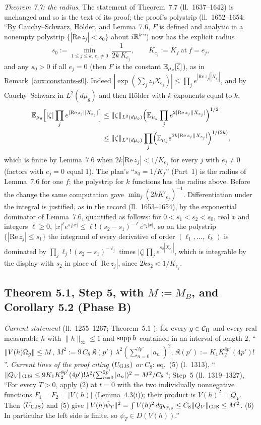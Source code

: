 \emph{Theorem 7.7: the radius.}  The statement of Theorem~7.7 (ll.~1637--1642) is unchanged and
so is the text of its proof; the proof's polystrip (ll.~1652--1654: ``By Cauchy--Schwarz,
H\"older, and Lemma~7.6, $F$ is defined and analytic in a nonempty polystrip
$\{|\mathrm{Re}\,z_j|<s_0\}$ about $i\mathbb{R}^k$'') now has the explicit radius
\[
 s_0:=\min_{1\le j\le k,\ e_j\ne0}\ \frac1{2k\,K_{e_j}},\qquad K_{e_j}:=K_f\ \text{at}\ f=e_j ,
\]
and any $s_0>0$ if all $e_j=0$ (then $F$ is the constant $\mathbb{E}_{\mu_g}[\overline\zeta]$), as in
Remark~\ref{aux:constants-s0}.  Indeed $|\exp(\sum_jz_jX_{e_j})|\le\prod_je^{|\mathrm{Re}\,z_j|
|X_{e_j}|}$, and by Cauchy--Schwarz in $L^2(d\mu_g)$ and then H\"older with $k$ exponents equal
to $k$,
\begin{align*}
 \mathbb{E}_{\mu_g}\Bigl[|\zeta|\prod_je^{|\mathrm{Re}\,z_j||X_{e_j}|}\Bigr]
 &\le\|\zeta\|_{L^2(d\mu_g)}\Bigl(\mathbb{E}_{\mu_g}\prod_je^{2|\mathrm{Re}\,z_j||X_{e_j}|}\Bigr)^{1/2}\\
 &\le\|\zeta\|_{L^2(d\mu_g)}\prod_j\Bigl(\mathbb{E}_{\mu_g}e^{2k|\mathrm{Re}\,z_j||X_{e_j}|}\Bigr)^{1/(2k)},
\end{align*}
which is finite by Lemma~7.6 when $2k|\mathrm{Re}\,z_j|<1/K_{e_j}$ for every $j$ with $e_j\ne0$
(factors with $e_j=0$ equal $1$).  The plan's ``$s_0=1/K_f$'' (Part~1) is the radius of Lemma~7.6
for one $f$; the polystrip for $k$ functions has the radius above.  Before the change the same
computation gave $\min_j(2kK'_{e_j})^{-1}$.  Differentiation under the integral is justified, as in
the record (ll.~1653--1654), by the exponential dominator of Lemma~7.6, quantified as follows: for
$0<s_1<s_2<s_0$, real $x$ and integers $\ell\ge0$, $|x|^\ell e^{s_1|x|}\le\ell!\,(s_2-s_1)^{-\ell}
e^{s_2|x|}$, so on the polystrip $\{|\mathrm{Re}\,z_j|\le s_1\}$ the integrand of every
derivative of order $(\ell_1,\dots,\ell_k)$ is dominated by $\prod_j\ell_j!\,(s_2-s_1)^{-\ell_j}$
times $|\zeta|\prod_je^{s_2|X_{e_j}|}$, which is integrable by the display with $s_2$ in place of
$|\mathrm{Re}\,z_j|$, since $2ks_2<1/K_{e_j}$.

\subsection{Theorem 5.1, Step 5, with $M:=M_B$, and Corollary 5.2 (Phase B)}\label{sub:cons-51}

\emph{Current statement} (ll.~1255--1267; Theorem~5.1 \cite[p.~18]{R}): for every $g\in\mathcal{C}_{\mathrm H}$ and
every real measurable $h$ with $\|h\|_\infty\le1$ and $\operatorname{supp} h$ contained in an interval of
length $2$, ``$\|V(h)\Omega_g\|\le M$, $M^2:=9\,C_8\,\mathfrak K(p')\,\lambda^2(\sum_{n=0}^{2p'}|a_n|)^2$,
$\mathfrak K(p'):=K_1K_2^{8p'}(4p')!$''.  \emph{Current lines of the proof citing $(U_{\rm GJS})$ or
$C_8$}: eq.~(5) (l.~1313), ``$\|Q_V\|_{\rm GJS}\le9K_1K_2^{8p'}(4p')!\lambda^2(\sum_{n=0}^{2p'}
|a_n|)^2=M^2/C_8$''; Step~5 (ll.~1319--1327), ``For every $T>0$, apply (2) at $t=0$ with the two
individually nonnegative functions $F_1=F_2=|V(h)|$ (Lemma~4.3(i)); their product is
$V(h)^2=Q_V$. Then $(U_{\rm GJS})$ and (5) give $\|V(h)\hat\psi_T\|^2=\int V(h)^2\,dq_{h_{T,g}}\le
C_8\|Q_V\|_{\rm GJS}\le M^2$. (6) In particular the left side is finite, so
$\psi_T\in D(V(h))$.''

